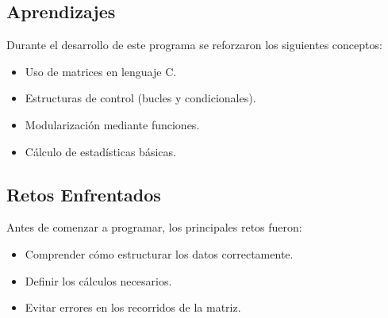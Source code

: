 \documentclass[12pt]{article}
\begin{document}
\subsection{Aprendizajes}
Durante el desarrollo de este programa se reforzaron los siguientes conceptos:
\begin{itemize}
\item Uso de matrices en lenguaje C.
\item Estructuras de control (bucles y condicionales).
\item Modularización mediante funciones.
\item Cálculo de estadísticas básicas.
\end{itemize}

\subsection{Retos Enfrentados}
Antes de comenzar a programar, los principales retos fueron:
\begin{itemize}
\item Comprender cómo estructurar los datos correctamente.
\item Definir los cálculos necesarios.
\item Evitar errores en los recorridos de la matriz.
\end{itemize}
\end{document}
